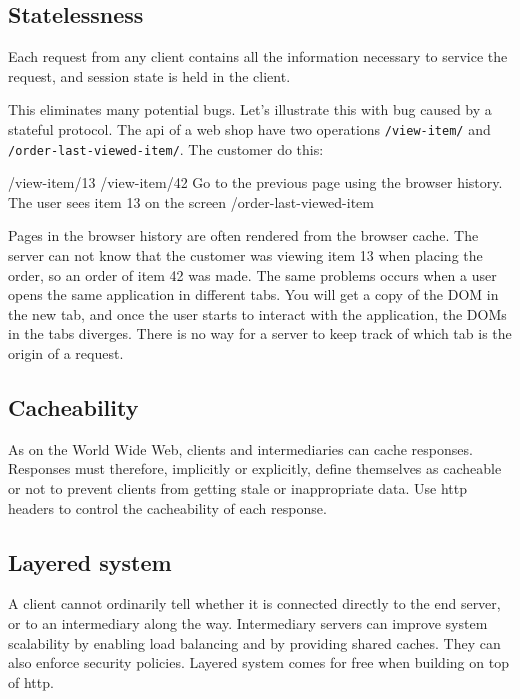 \subsection{Statelessness}
Each request from any client contains all the information necessary to service the request, and session state is held in the client.

This eliminates many potential bugs. Let's illustrate this with bug caused by a stateful protocol. The api of a web shop have two operations \texttt{/view-item/} and \texttt{/order-last-viewed-item/}. The customer do this:
\begin{Code}
/view-item/13
/view-item/42
  Go to the previous page using the browser history.
  The user sees item 13 on the screen
/order-last-viewed-item
\end{Code}
Pages in the browser history are often rendered from the browser cache. The server can not know that the customer was viewing item 13 when placing the order, so an order of item 42 was made. The same problems occurs when a user opens the same application in different tabs. You will get a copy of the DOM in the new tab, and once the user starts to interact with the application, the DOMs in the tabs diverges. There is no way for a server to keep track of which tab is the origin of a request.

\subsection{Cacheability}
As on the World Wide Web, clients and intermediaries can cache responses. Responses must therefore, implicitly or explicitly, define themselves as cacheable or not to prevent clients from getting stale or inappropriate data. Use http headers to control the cacheability of each response.

\subsection{Layered system}
A client cannot ordinarily tell whether it is connected directly to the end server, or to an intermediary along the way. Intermediary servers can improve system scalability by enabling load balancing and by providing shared caches. They can also enforce security policies. Layered system comes for free when building on top of http.

